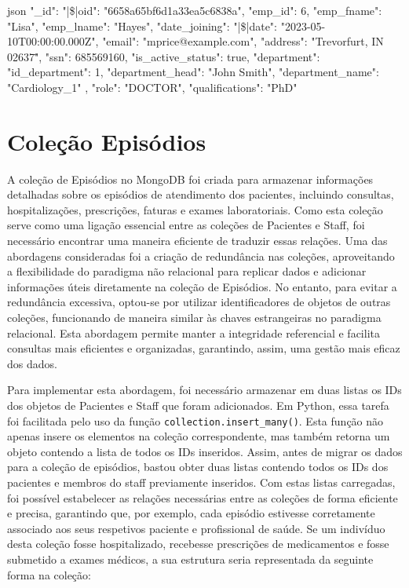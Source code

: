 \begin{myminted}{json}
{
  "_id": {"|\$|oid": "6658a65bf6d1a33ea5c6838a"},
  "emp_id": 6,
  "emp_fname": "Lisa",
  "emp_lname": "Hayes",
  "date_joining": {"|\$|date": "2023-05-10T00:00:00.000Z"},
  "email": "mprice@example.com",
  "address": "Trevorfurt, IN 02637\"",
  "ssn": 685569160,
  "is_active_status": true,
  "department": {
    "id_department": 1,
    "department_head": "John Smith",
    "department_name": "Cardiology_1"
  },
  "role": "DOCTOR",
  "qualifications": "PhD"
}
\end{myminted}

\section{Coleção Episódios}

A coleção de Episódios no MongoDB foi criada para armazenar informações detalhadas sobre os episódios de atendimento dos pacientes, incluindo consultas, hospitalizações, prescrições, faturas e exames laboratoriais. Como esta coleção serve como uma ligação essencial entre as coleções de Pacientes e Staff, foi necessário encontrar uma maneira eficiente de traduzir essas relações. Uma das abordagens consideradas foi a criação de redundância nas coleções, aproveitando a flexibilidade do paradigma não relacional para replicar dados e adicionar informações úteis diretamente na coleção de Episódios. No entanto, para evitar a redundância excessiva, optou-se por utilizar identificadores de objetos de outras coleções, funcionando de maneira similar às chaves estrangeiras no paradigma relacional. Esta abordagem permite manter a integridade referencial e facilita consultas mais eficientes e organizadas, garantindo, assim, uma gestão mais eficaz dos dados. 

Para implementar esta abordagem, foi necessário armazenar em duas listas os IDs dos objetos de Pacientes e Staff que foram adicionados. Em Python, essa tarefa foi facilitada pelo uso da função \texttt{collection.insert_many()}. Esta função não apenas insere os elementos na coleção correspondente, mas também retorna um objeto contendo a lista de todos os IDs inseridos. Assim, antes de migrar os dados para a coleção de episódios, bastou obter duas listas contendo todos os IDs dos pacientes e membros do staff previamente inseridos. Com estas listas carregadas, foi possível estabelecer as relações necessárias entre as coleções de forma eficiente e precisa, garantindo que, por exemplo, cada episódio estivesse corretamente associado aos seus respetivos paciente e profissional de saúde. Se um indivíduo desta coleção fosse hospitalizado, recebesse prescrições de medicamentos e fosse submetido a exames médicos, a sua estrutura seria representada da seguinte forma na coleção:

